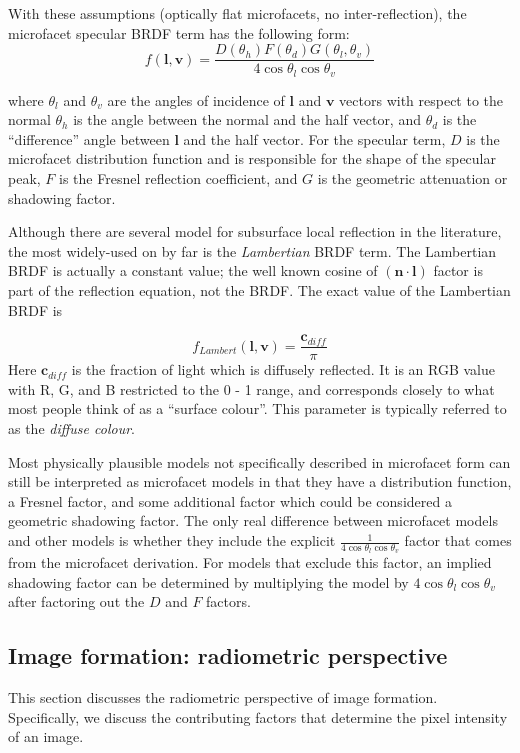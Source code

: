 With these assumptions (optically flat microfacets, no inter-reflection), the microfacet specular BRDF term has the following form:
$$
f(\mathbf{l}, \mathbf{v}) = \frac{D(\theta_h)F(\theta_d)G(\theta_l, \theta_v)}{4\cos\theta_l\cos\theta_v}
$$

where $\theta_l$ and $\theta_v$ are the angles of incidence of $\mathbf{l}$ and $\mathbf{v}$ vectors with respect to the normal $\theta_h$ is the angle between the normal and the half vector, and $\theta_d$ is the ``difference'' angle between $\mathbf{l}$ and the half vector. For the specular term, $D$ is the microfacet distribution function and is responsible for the shape of the specular peak, $F$ is the Fresnel reflection coefficient, and $G$ is the geometric attenuation or shadowing factor. 

Although there are several model for subsurface local reflection in the literature, the most widely-used on by far is the \textit{Lambertian} BRDF term. The Lambertian BRDF is actually a constant value; the well known cosine of $(\mathbf{n}\cdot\mathbf{l})$ factor is part of the reflection equation, not the BRDF. The exact value of the Lambertian BRDF is

$$
f_{Lambert}(\mathbf{l}, \mathbf{v}) = \frac{\mathbf{c}_{diff}}{\pi}
$$
Here $\mathbf{c}_{diff}$ is the fraction of light which is diffusely reflected. It is an RGB value with R, G, and B restricted to the 0 - 1 range, and corresponds closely to what most people think of as a ``surface colour''. This parameter is typically referred to as the \textit{diffuse colour}.

Most physically plausible models not specifically described in microfacet form can still be interpreted as microfacet models in that they have a distribution function, a Fresnel factor, and some additional factor which could be considered a geometric shadowing factor. The only real difference
between microfacet models and other models is whether they include the explicit $\frac{1}{4\cos\theta_l\cos\theta_v}$ factor that comes from the microfacet derivation. For models that exclude this factor, an implied shadowing factor can be determined by multiplying the model by $4\cos\theta_l\cos\theta_v$ after factoring out the $D$ and $F$ factors.

\subsection{Image formation: radiometric perspective}
This section discusses the radiometric perspective of image formation. Specifically, we discuss the contributing factors that determine the pixel intensity of an image.

